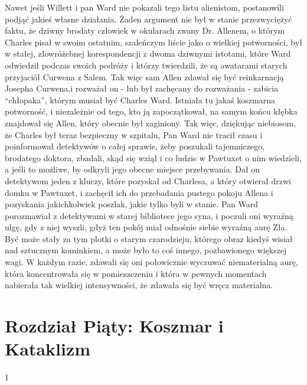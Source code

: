 Nawet jeśli Willett i pan Ward nie pokazali tego listu alienistom, postanowili podjąć jakieś własne działania. Żaden argument nie był w stanie przezwyciężyć faktu, że dziwny brodaty człowiek w okularach zwany Dr. Allenem, o którym Charles pisał w swoim ostatnim, szaleńczym liście jako o wielkiej potworności, był w stałej, złowróżebnej korespondencji z dwoma dziwnymi istotami, które Ward odwiedził podczas swoich podróży i którzy twierdzili, że są awatarami starych przyjaciół Curwena z Salem.  Tak więc sam Allen zdawał się być reinkarnacją Josepha Curwena,i rozważał on - lub był zachęcany do rozważania - zabicia ``chłopaka'', którym musiał być Charles Ward. Istniała tu jakaś koszmarna potworność, i niezależnie od tego, kto ją zapoczątkował, na samym końcu kłębka znajdował się Allen, który obecnie był zaginiony. Tak więc, dziękując niebiosom, że Charles był teraz bezpieczny w szpitalu, Pan Ward nie tracił czasu i poinformował detektywów o całej sprawie, żeby poszukali tajemniczego, brodatego doktora, zbadali, skąd się wziął i co ludzie w Pawtuxet o nim wiedzieli, a jeśli to możliwe, by odkryli jego obecne miejsce przebywania. Dał on detektywom jeden z kluczy, które pozyskał od Charlesa, a który otwierał drzwi domku w Pawtuxet, i zachęcił ich do przebadania pustego pokoju Allena i pozyskania jakichkolwiek poszlak, jakie tylko byli w stanie. Pan Ward porozmawiał z detektywami w starej bibliotece jego syna, i poczuli oni wyraźną ulgę, gdy z niej wyszli, gdyż ten pokój miał odnośnie siebie wyraźną aurę Zła. Być może stały za tym plotki o starym czarodzieju, którego obraz kiedyś wisiał nad sztucznym kominkiem, a może było to coś innego, pozbawionego większej wagi. W każdym razie, zdawali się oni połowicznie wyczuwać niematerialną aurę, która koncentrowała się w pomieszczeniu i która w pewnych momentach nabierała tak wielkiej intensywności, że zdawała się być wręcz materialna.  

\section{Rozdział Piąty: Koszmar i Kataklizm}

\begin{center}
1
\end{center}

